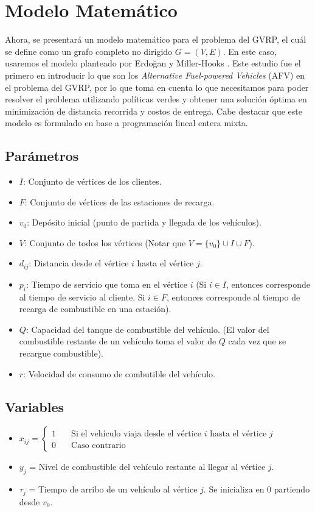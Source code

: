 \documentclass[letter, 10pt]{article}
\begin{document}
\section{Modelo Matem\'atico}

Ahora, se presentará un modelo matemático para el problema del GVRP, el cuál se define como un grafo completo no dirigido $G = (V,E)$. En este caso, usaremos el modelo planteado por Erdoğan y Miller-Hooks \cite{ERDOGANMILLERHOOKS}. Este estudio fue el primero en introducir lo que son los \emph{Alternative Fuel-powered Vehicles} (AFV) en el problema del GVRP, por lo que toma en cuenta lo que necesitamos para poder resolver el problema utilizando políticas verdes y obtener una solución óptima en minimización de distancia recorrida y costos de entrega. Cabe destacar que este modelo es formulado en base a programación lineal entera mixta.

\subsection{Parámetros}
\begin{itemize}
    \item $I$: Conjunto de vértices de los clientes.
    \item $F$: Conjunto de vértices de las estaciones de recarga.
    \item $v_0$: Depósito inicial (punto de partida y llegada de los vehículos).
    \item $V$: Conjunto de todos los vértices (Notar que $V = \{v_0\} \cup I \cup F$).
    \item $d_{ij}$: Distancia desde el vértice $i$ hasta el vértice $j$.
    \item $p_i$: Tiempo de servicio que toma en el vértice $i$ (Si $i \in I$, entonces corresponde al tiempo de servicio al cliente. Si $i \in F$, entonces corresponde al tiempo de recarga de combustible en una estación).
    \item $Q$: Capacidad del tanque de combustible del vehículo.  (El valor del combustible restante de un vehículo toma el valor de $Q$ cada vez que se recargue combustible).
    \item $r$: Velocidad de consumo de combutible del vehículo.
\end{itemize}

\subsection{Variables}
\begin{itemize}
    \item     $x_{ij} = \left\{
        \begin{array}{ll}
            1 & \quad \text{Si el vehículo viaja desde el vértice $i$ hasta el vértice $j$} \\
            0 & \quad \text{Caso contrario}
        \end{array}
    \right.$
    \item $y_j$ = Nivel de combustible del vehículo restante al llegar al vértice $j$.
    \item $\tau_j$ = Tiempo de arribo de un vehículo al vértice $j$. Se inicializa en $0$ partiendo desde $v_0$.
\end{itemize}
\end{document}

